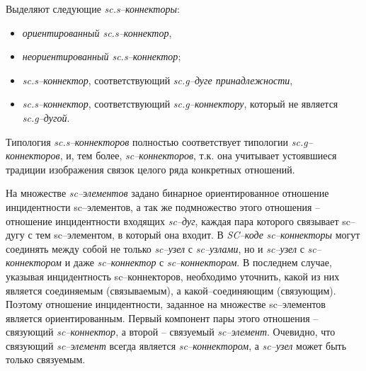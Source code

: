 \begin{SCn}
\end{SCn}

Выделяют следующие \textit{sc.s--коннекторы}:
\begin{itemize}
	\item \textit{ориентированный \textit{sc.s--коннектор}},
	\item \textit{неориентированный \textit{sc.s--коннектор}};
	\item \textit{\textit{sc.s--коннектор}}, соответствующий \textit{sc.g--дуге принадлежности},
	\item \textit{\textit{sc.s--коннектор}}, соответствующий \textit{sc.g--коннектору}, который не является \textit{sc.g--дугой}.
\end{itemize}

Типология \textit{sc.s--коннекторов} полностью соответствует типологии \textit{sc.g--коннекторов}, и, тем более, \textit{sc--коннекторов}, т.к. она учитывает устоявшиеся традиции изображения связок целого ряда конкретных отношений.

На множестве \textit{sc--элементов} задано бинарное ориентированное отношение инцидентности sc--элементов, а так же подмножество этого отношения – отношение инцидентности входящих \textit{sc--дуг}, каждая пара которого связывает sc--дугу с тем sc--элементом, в который она входит. В \textit{SC--коде} \textit{sc--коннекторы} могут соединять между собой не только \textit{sc--узел} с \textit{sc--узлами}, но и \textit{sc--узел} с \textit{sc--коннектором} и даже \textit{sc--коннектор} с \textit{sc--коннектором}. В последнем случае, указывая инцидентность sc--коннекторов, необходимо уточнить, какой из них является соединяемым (связываемым), а какой--соединяющим (связующим). Поэтому отношение инцидентности, заданное на множестве sc--элементов является ориентированным. Первый компонент пары этого отношения – связующий \textit{sc--коннектор}, а второй – связуемый \textit{sc--элемент}. Очевидно, что связующий \textit{sc--элемент} всегда является \textit{sc--коннектором}, а \textit{sc--узел} может быть только связуемым.

